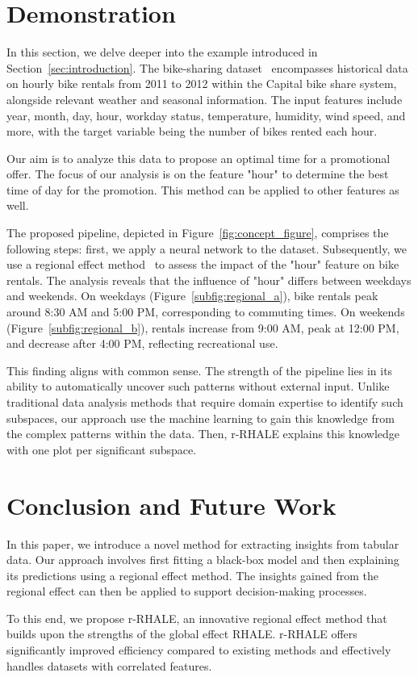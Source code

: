 \documentclass[
twocolumn,
]{ceurart}
\begin{document}
\section{Demonstration}
\label{sec:demonstration}

In this section, we delve deeper into the example introduced in Section~\ref{sec:introduction}. The bike-sharing dataset~\cite{fanaee2014event} encompasses historical data on hourly bike rentals from 2011 to 2012 within the Capital bike share system, alongside relevant weather and seasonal information. The input features include year, month, day, hour, workday status, temperature, humidity, wind speed, and more, with the target variable being the number of bikes rented each hour.

Our aim is to analyze this data to propose an optimal time for a promotional offer. The focus of our analysis is on the feature "hour" to determine the best time of day for the promotion. This method can be applied to other features as well.

The proposed pipeline, depicted in Figure~\ref{fig:concept_figure}, comprises the following steps: first, we apply a neural network to the dataset. Subsequently, we use a regional effect method~\cite{herbinger2023decomposing, herbinger_repid_2022} to assess the impact of the "hour" feature on bike rentals. The analysis reveals that the influence of "hour" differs between weekdays and weekends. On weekdays (Figure~\ref{subfig:regional_a}), bike rentals peak around 8:30 AM and 5:00 PM, corresponding to commuting times. On weekends (Figure~\ref{subfig:regional_b}), rentals increase from 9:00 AM, peak at 12:00 PM, and decrease after 4:00 PM, reflecting recreational use.

This finding aligns with common sense. The strength of the pipeline lies in its ability to automatically uncover such patterns without external input. Unlike traditional data analysis methods that require domain expertise to identify such subspaces, our approach use the machine learning to gain this knowledge from the complex patterns within the data. Then, r-RHALE explains this knowledge with one plot per significant subspace.

\section{Conclusion and Future Work}

In this paper, we introduce a novel method for extracting insights from tabular data. Our approach involves first fitting a black-box model and then explaining its predictions using a regional effect method. The insights gained from the regional effect can then be applied to support decision-making processes.

To this end, we propose r-RHALE, an innovative regional effect method that builds upon the strengths of the global effect RHALE. r-RHALE offers significantly improved efficiency compared to existing methods and effectively handles datasets with correlated features.


\end{document}
